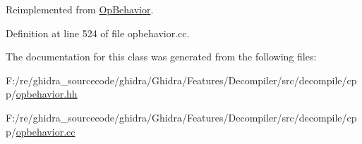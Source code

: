 Reimplemented from \mbox{\hyperlink{class_op_behavior_aeeed3af7aa35264b31a1f182884214a9}{Op\+Behavior}}.



Definition at line 524 of file opbehavior.\+cc.



The documentation for this class was generated from the following files\+:\begin{DoxyCompactItemize}
\item 
F\+:/re/ghidra\+\_\+sourcecode/ghidra/\+Ghidra/\+Features/\+Decompiler/src/decompile/cpp/\mbox{\hyperlink{opbehavior_8hh}{opbehavior.\+hh}}\item 
F\+:/re/ghidra\+\_\+sourcecode/ghidra/\+Ghidra/\+Features/\+Decompiler/src/decompile/cpp/\mbox{\hyperlink{opbehavior_8cc}{opbehavior.\+cc}}\end{DoxyCompactItemize}
